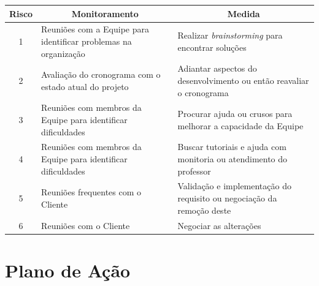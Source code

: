 \documentclass[a4paper,12pt]{article}
\begin{document}
{\normalsize

\begin{longtable}{|c|p{6cm}|p{6.5cm}|}
\hline

\multicolumn{1}{|c|}{\textbf{Risco}}  & \multicolumn{1}{c|}{\textbf{Monitoramento}} & \multicolumn{1}{c|}{\textbf{Medida}} \\
\hline
1	  & Reuniões com a Equipe para identificar problemas na organização & Realizar \textit{brainstorming} para encontrar soluções\\
\hline
2	& Avaliação do cronograma com o estado atual do projeto & Adiantar aspectos do desenvolvimento ou então reavaliar o cronograma\\
\hline
3	& Reuniões com membros da Equipe para identificar dificuldades	& Procurar ajuda ou crusos para melhorar a capacidade da Equipe\\
\hline
4	& Reuniões com membros da Equipe para identificar dificuldades	& Buscar tutoriais e ajuda com monitoria ou atendimento do professor\\
\hline
5	& Reuniões frequentes com o Cliente	& Validação e implementação do requisito ou negociação da remoção deste\\
\hline
6	& Reuniões com o Cliente	& Negociar as alterações\\
\hline
\end{longtable}
}





\newpage
\section{Plano de Ação}
\end{document}
